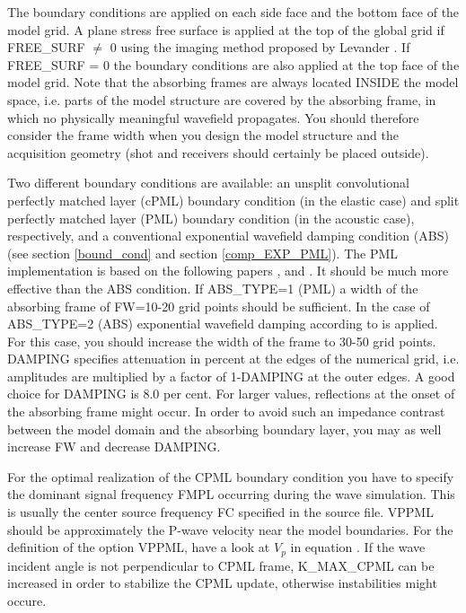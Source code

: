 \documentclass[11pt,onecolumn,oneside]{article}
\begin{document}
The boundary conditions are applied on each side face and the bottom face of the model grid. A plane stress free surface is applied at the top of the global grid if FREE\_SURF $\neq$ 0 using the imaging method proposed by Levander \cite{levander:88}. If FREE\_SURF = 0 the boundary conditions are also applied at the top face of the model grid. Note that the absorbing frames are always located INSIDE the model space, i.e. parts of the model structure are covered by the absorbing frame, in which no physically meaningful wavefield propagates. You should therefore consider the frame width when you design the model structure and the acquisition geometry (shot and receivers should certainly be placed outside).

Two different boundary conditions are available: an unsplit convolutional perfectly matched layer (cPML) boundary condition (in the elastic case) and split perfectly matched layer (PML) boundary condition (in the acoustic case), respectively, and a conventional exponential wavefield damping condition (ABS) (see section \ref{bound_cond} and section \ref{comp_EXP_PML}). The PML implementation is based on the following papers \cite{collino:01}, \cite{komatitsch:07} and \cite{martin:09}. It should be much more effective than the ABS condition. If ABS\_TYPE=1 (PML) a width of the absorbing frame of FW=10-20 grid points should be sufficient. In the case of ABS\_TYPE=2 (ABS) exponential wavefield damping according to \cite{cerjan:85} is applied. For this case, you should increase the width of the frame to 30-50 grid points. DAMPING specifies attenuation in percent at the edges of the numerical grid, i.e. amplitudes are multiplied by a factor of 1-DAMPING at the outer edges. A good choice for DAMPING is 8.0 per cent. For larger values, reflections at the onset of the absorbing frame might occur. In order to avoid such an impedance contrast between the model domain and the absorbing boundary layer, you may as well increase FW and decrease DAMPING.

For the optimal realization of the CPML boundary condition you have to specify the dominant signal frequency FMPL occurring during the wave simulation. This is usually the center source frequency FC specified in the source file. VPPML should be approximately the P-wave velocity near the model boundaries. For the definition of the option VPPML, have a look at $V_p$ in equation . If the wave incident angle is not perpendicular to CPML frame, K\_MAX\_CPML can be increased in order to stabilize the CPML update, otherwise instabilities might occure.
\end{document}

